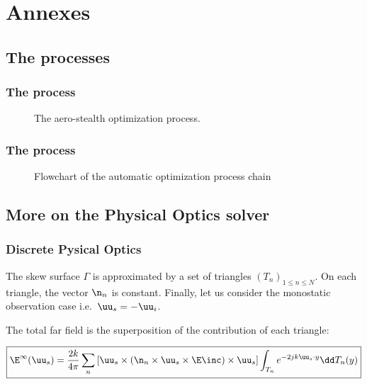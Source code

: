 \documentclass[beamer]{standalone}
\begin{document}
\section{Annexes}
\label{sec:annexe}

\subsection{The processes}
\begin{frame}
    \frametitle{The process}

    \begin{figure}
        \centering
        \caption*{The aero-stealth optimization process.}
        \label{fig:optim-process}
    \end{figure}
\end{frame}

\begin{frame}
    \frametitle{The process}

    \begin{figure}[htp]
    \captionsetup{justification=centering}

    \centering
    \caption*{Flowchart of the automatic optimization process chain}
    \label{bem-fig:optim-process}
\end{figure}
\end{frame}


\subsection{More on the Physical Optics solver}
\begin{frame}
    \frametitle{Discrete Pysical Optics}
    \label{fra:discrete-physical-optics}
    The skew surface $\Gamma$ is approximated by a set of triangles $(T_n)_{1\leq n\leq N}$. On each triangle, the vector $\n_n$ is constant. Finally, let us consider the monostatic observation case i.e.~$\uu_s = -\uu_i$.

    The total far field is the superposition of the contribution of each triangle:
    
    \begin{equation}
        \boxed{
        \E^{\infty}(\uu_s) = \frac{2k}{4\pi}\sum_n\left[ \uu_s\times\left(\n_n\times \uu_s\times\E\inc\right)\times \uu_s\right]\int_{T_n}e^{-2jk \uu_s\cdot y}\dd T_n(y)
        }
    \end{equation}

    \hyperlink{fra:integral-discretization}{}
\end{frame}
\end{document}
